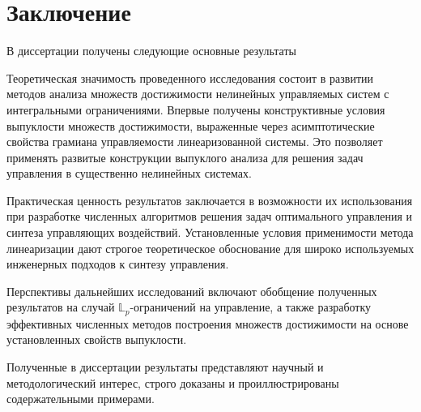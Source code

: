 \documentclass[../main.tex]{subfiles}
\begin{document}
\newpage
\section*{Заключение}
В диссертации получены следующие основные результаты


Теоретическая значимость проведенного исследования состоит в развитии методов анализа множеств достижимости нелинейных управляемых систем с интегральными ограничениями. 
Впервые получены конструктивные условия выпуклости множеств достижимости, выраженные через асимптотические свойства грамиана управляемости линеаризованной системы. 
Это позволяет применять развитые конструкции выпуклого анализа для решения задач управления в существенно нелинейных системах.

Практическая ценность результатов заключается в возможности их использования при разработке численных алгоритмов решения задач оптимального управления и синтеза управляющих воздействий. 
Установленные условия применимости метода линеаризации дают строгое теоретическое обоснование для широко используемых инженерных подходов к синтезу управления.

Перспективы дальнейших исследований включают обобщение полученных результатов на случай $\mathbb{L}_p$-ограничений на управление, а также разработку эффективных численных методов построения множеств достижимости на основе установленных свойств выпуклости.

Полученные в диссертации результаты представляют научный и методологический интерес, строго доказаны и проиллюстрированы содержательными примерами.
\end{document}
